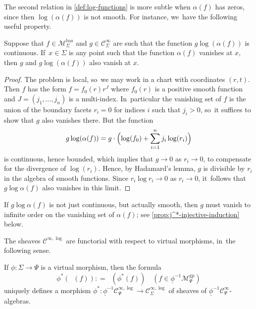 \documentclass[JEP,XML,SOM,Unicode,NoFloatCountersInSection,published]{cedram}
\newcommand{\rBrac}[1]{\Bigl(#1\Bigr)}
\theoremstyle{definition}
\theoremstyle{remark}
\newenvironment{remark}
  {\pushQED{\qed}\renewcommand{\qedsymbol}{$\lozenge$}\remarkx}
  {\popQED\endremarkx}
\newcommand{\ulog}{\mathop{\widetilde{\log}}\nolimits}
\newcommand{\defas}{\mathrel{\mathop:}=}
\newcommand{\cMgp}{\mathscr{M}^{\mathrm{gp}}}
\newcommand{\cMbas}{\mathscr{M}^{\mathrm{bas}}}
\newcommand{\Cinf}[1]{\mathscr{C}^{\infty}_{#1}}
\newcommand{\Cinflog}[1]{\mathscr{C}^{\infty,\log}_{#1}}
\newcommand{\Sig}{\Sigma}
\newcommand{\uphi}{\underline{\phi}}
\begin{document}
The second relation in \autoref{def:log-functions} is more subtle when $\alpha(f)$ has zeros, since then $\log( \alpha(f))$ is not smooth. For instance, we~have the following useful property.

\begin{lemma}\label{lem:flat-times-log}
Suppose that $f \in \cMbas_\Sig$ and $g \in \Cinf{\Sig}$ are such that the function $g\log(\alpha(f))$ is continuous. If~$x \in \Sig$ is any point such that the function $\alpha(f)$ vanishes at $x$, then $g$ and $g\log(\alpha(f))$ also vanish at $x$.
\end{lemma}

\begin{proof}
The problem is local, so~we may work in a chart with coordinates $(r,t)$. Then $f$ has the form $f = f_0(r) r^J$ where $f_0(r)$ is a positive smooth function and $J =(j_1,\ldots,j_n)$ is a multi-index. In~particular the vanishing set of $f$ is the union of the boundary facets $r_i=0$ for indices $i$ such that $j_i> 0$, so~it suffices to show that $g$ also vanishes there. But the function
\[
g \log(\alpha(f)) = g \cdot \rBrac{\log(f_0) + \sum_{i=1}^n j_i \log(r_i)}
\]
is continuous, hence bounded, which implies that $g \to 0$ as $r_i \to 0$, to compensate for the divergence of $\log(r_i)$.
Hence, by Hadamard's lemma, $g$ is divisible by $r_i$ in the algebra of smooth functions. Since $r_i\log r_i \to 0$ as $r_i\rightarrow 0$, it~follows that $g\log\alpha(f)$ also vanishes in this limit.
\end{proof}
\begin{remark}
If $g \log \alpha(f)$ is not just continuous, but actually smooth, then $g$ must vanish to infinite order on the vanishing set of $\alpha(f)$; see \autoref{prop:j^*-injective-induction} below.
\end{remark}

The sheaves $\Cinflog{}$ are functorial with respect to virtual morphisms, in~the following sense.

\begin{lemma}\label{lem:functoriality-of-log-functions}
If $\phi\colon \Sig \to \Psi$ is a virtual morphism, then the formula
\[
\phi^*(\ulog(f))\defas\ulog(\phi^*(f)) \quad (f\in\uphi^{-1}\cMgp_\Psi)
\]
uniquely defines a morphism $\phi^*\colon \uphi^{-1}\Cinflog{\Psi} \to \Cinflog{\Sig}$ of sheaves of $\uphi^{-1}\Cinf{\Psi}$-algebras.
\end{lemma}
\end{document}
